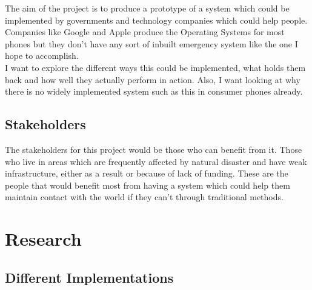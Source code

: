 \documentclass{report}
\begin{document}
The aim of the project is to produce a prototype of a system which could be implemented by governments and technology 
companies which could help people. Companies like Google and Apple produce the Operating Systems for most phones but 
they don't have any sort of inbuilt emergency system like the one I hope to accomplish. 
\bigskip\\
I want to explore the different ways this could be implemented, what holds them back and how well they actually perform 
in action. Also, I want looking at why there is no widely implemented system such as this in consumer phones already. 

\section*{Stakeholders}

The stakeholders for this project would be those who can benefit from it. Those who live in areas 
which are frequently affected by natural disaster and have weak infrastructure, either as a result or because of lack 
of funding. These are the people that would benefit most from having a system which could help them maintain contact 
with the world if they can't through traditional methods.

\chapter*{Research}

\section*{Different Implementations}
\end{document}
